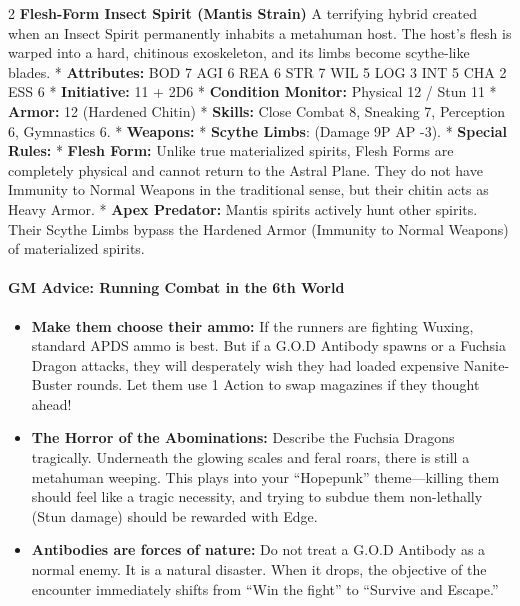 \documentclass[
  oneside]{article}
\providecommand{\tightlist}{%
  \setlength{\itemsep}{0pt}\setlength{\parskip}{0pt}}
\begin{document}
\begin{multicols}{2}
\textbf{Flesh-Form Insect Spirit (Mantis Strain)}
A terrifying hybrid created when an Insect Spirit
permanently inhabits a metahuman host. The host's
flesh is warped into a hard, chitinous
exoskeleton, and its limbs become scythe-like
blades. * \textbf{Attributes:} BOD 7 \textbar{}
AGI 6 \textbar{} REA 6 \textbar{} STR 7 \textbar{}
WIL 5 \textbar{} LOG 3 \textbar{} INT 5 \textbar{}
CHA 2 \textbar{} ESS 6 * \textbf{Initiative:} 11 +
2D6 * \textbf{Condition Monitor:} Physical 12 /
Stun 11 * \textbf{Armor:} 12 (Hardened Chitin) *
\textbf{Skills:} Close Combat 8, Sneaking 7,
Perception 6, Gymnastics 6. * \textbf{Weapons:} *
\textbf{Scythe Limbs}: (Damage 9P \textbar{} AP
-3). * \textbf{Special Rules:} * \textbf{Flesh
Form:} Unlike true materialized spirits, Flesh
Forms are completely physical and cannot return to
the Astral Plane. They do not have Immunity to
Normal Weapons in the traditional sense, but their
chitin acts as Heavy Armor. * \textbf{Apex
Predator:} Mantis spirits actively hunt other
spirits. Their Scythe Limbs bypass the Hardened
Armor (Immunity to Normal Weapons) of materialized
spirits.

\hypertarget{gm-advice-running-combat-in-the-6th-world}{%
\paragraph{GM Advice: Running Combat in the 6th
World}\label{gm-advice-running-combat-in-the-6th-world}}

\begin{itemize}
\tightlist
\item
  \textbf{Make them choose their ammo:} If the
  runners are fighting Wuxing, standard APDS ammo
  is best. But if a G.O.D Antibody spawns or a
  Fuchsia Dragon attacks, they will desperately
  wish they had loaded expensive Nanite-Buster
  rounds. Let them use 1 Action to swap magazines
  if they thought ahead!
\item
  \textbf{The Horror of the Abominations:}
  Describe the Fuchsia Dragons tragically.
  Underneath the glowing scales and feral roars,
  there is still a metahuman weeping. This plays
  into your ``Hopepunk'' theme---killing them
  should feel like a tragic necessity, and trying
  to subdue them non-lethally (Stun damage) should
  be rewarded with Edge.
\item
  \textbf{Antibodies are forces of nature:} Do not
  treat a G.O.D Antibody as a normal enemy. It is
  a natural disaster. When it drops, the objective
  of the encounter immediately shifts from ``Win
  the fight'' to ``Survive and Escape.''
\end{itemize}


\end{multicols}
\end{document}
